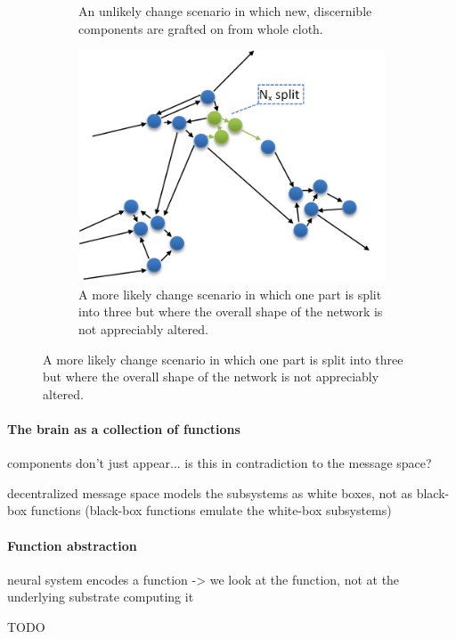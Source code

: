 \documentclass[]{scrartcl}
\begin{document}
\begin{figure}
\begin{subfigure}[t]{0.45\textwidth}
		\caption{An unlikely change scenario in which new, discernible components are grafted on from whole cloth.}
		\label{fig:unlikelyEvolution}
	\end{subfigure}
	\begin{subfigure}[t]{0.45\textwidth}
		\includegraphics[width=\textwidth]{figs/likelyEvolution.png}
		\caption{A more likely change scenario in which one part is split into three but where the overall shape of the network is not appreciably altered.}
		\label{fig:likelyEvolution}
	\end{subfigure}
\end{figure}

\paragraph{The brain as a collection of functions}

components don't just appear... is this in contradiction to the message space?

decentralized message space models the subsystems as white boxes, not as black-box functions (black-box functions emulate the white-box subsystems)

\paragraph{Function abstraction}

neural system encodes a function -> we look at the function, not at the underlying substrate computing it

TODO

\end{document}
